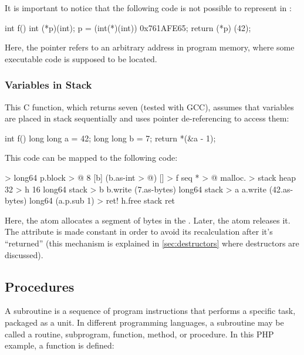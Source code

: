 \documentclass[sigplan,nonacm]{acmart}
\begin{document}
It is important to notice that the following code is not possible to represent in \eolang{}:

\begin{ffcode}
int f() {
  int (*p)(int);
  p = (int(*)(int)) 0x761AFE65;
  return (*p) (42);
}
\end{ffcode}

Here, the pointer refers to an arbitrary address in program memory, where some executable code is supposed to be located.

\subsubsection{Variables in Stack}

This C function, which returns seven (tested with GCC), assumes that variables are placed in stack sequentially and uses pointer de-referencing to access them:

\begin{ffcode}
int f() {
  long long a = 42;
  long long b = 7;
  return *(&a - 1);
}
\end{ffcode}

This code can be mapped to the following \eolang{} code:

\begin{ffcode}
[p] > long64
  p.block > @
    8
    [b] (b.as-int > @)
[] > f
  seq * > @
    malloc. > stack
      heap 32 > h
      16
    long64 stack > b
    b.write (7.as-bytes)
    long64 stack > a
    a.write (42.as-bytes)
    long64 (a.p.sub 1) > ret!
    h.free stack
    ret
\end{ffcode}

Here, the atom  allocates a segment of bytes in the . Later, the atom  releases it. The attribute  is made constant in order to avoid its recalculation after it's ``returned'' (this mechanism is explained in \cref{sec:destructors} where destructors are discussed).

\subsection{Procedures}
\label{sec:procedures}

A subroutine is a sequence of program instructions that performs a specific task, packaged as a unit. In different programming languages, a subroutine may be called a routine, subprogram, function, method, or procedure. In this PHP example, a function  is defined:
\end{document}
